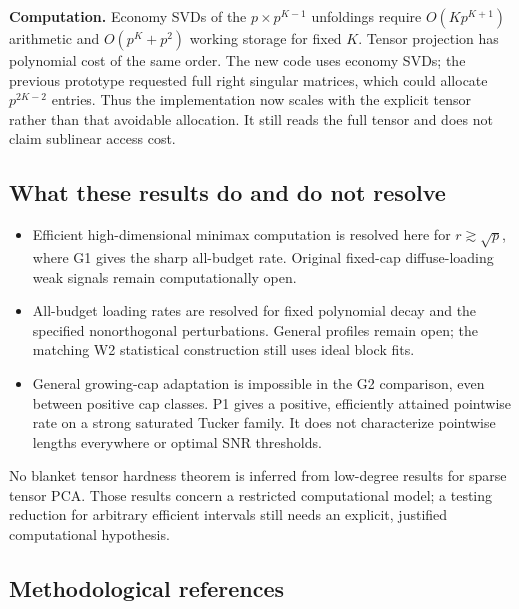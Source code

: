 \textbf{Computation.} Economy SVDs of the \(p\times p^{K-1}\) unfoldings
require \(O(Kp^{K+1})\) arithmetic and \(O(p^K+p^2)\) working storage
for fixed \(K\). Tensor projection has polynomial cost of the same
order. The new code uses economy SVDs; the previous prototype requested
full right singular matrices, which could allocate \(p^{2K-2}\) entries.
Thus the implementation now scales with the explicit tensor rather than
that avoidable allocation. It still reads the full tensor and does not
claim sublinear access cost.

\subsection{What these results do and do not
resolve}\label{what-these-results-do-and-do-not-resolve}

\begin{itemize}
\tightlist
\item
  Efficient high-dimensional minimax computation is resolved here for
  \(r\gtrsim\sqrt p\), where G1 gives the sharp all-budget rate.
  Original fixed-cap diffuse-loading weak signals remain computationally
  open.
\item
  All-budget loading rates are resolved for fixed polynomial decay and
  the specified nonorthogonal perturbations. General profiles remain
  open; the matching W2 statistical construction still uses ideal block
  fits.
\item
  General growing-cap adaptation is impossible in the G2 comparison,
  even between positive cap classes. P1 gives a positive, efficiently
  attained pointwise rate on a strong saturated Tucker family. It does
  not characterize pointwise lengths everywhere or optimal SNR
  thresholds.
\end{itemize}

No blanket tensor hardness theorem is inferred from low-degree results
for sparse tensor PCA. Those results concern a restricted computational
model; a testing reduction for arbitrary efficient intervals still needs
an explicit, justified computational hypothesis.

\subsection{Methodological references}\label{methodological-references}

